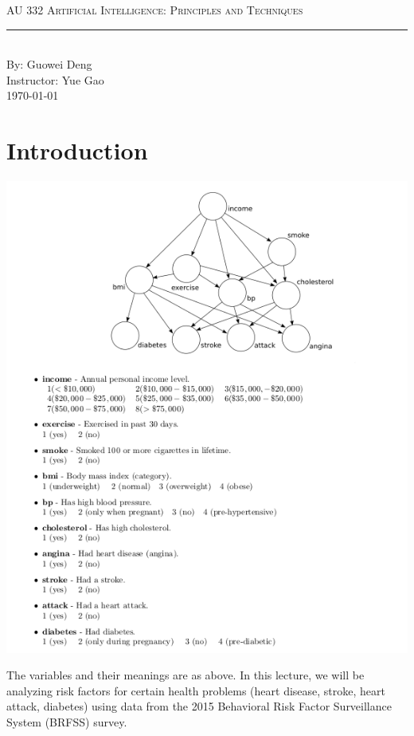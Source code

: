 \documentclass[aps,letterpaper,10pt]{revtex4}
\newcommand{\labtitle}{AU 332 Artificial Intelligence: Principles and Techniques}
\newcommand{\authorname}{Guowei Deng}
\newcommand{\professor}{Yue Gao}
\begin{document}
\begin{titlepage}
\begin{center}
{\Large \textsc{\labtitle} \\ \vspace{4pt}}
\rule[13pt]{\textwidth}{1pt} \\ \vspace{150pt}
{\large By: \authorname \\ \vspace{10pt}
Instructor: \professor \\ \vspace{10pt}
\today}
\end{center}
\end{titlepage}
\section{Introduction}
\begin{center}
\includegraphics[scale=0.8]{graph.png}
\end{center}
The variables and their meanings are as above. In this lecture, we will be analyzing risk factors 
for certain health problems (heart disease, stroke, heart attack, diabetes) using data from the 2015 Behavioral Risk Factor Surveillance System (BRFSS) survey.
\newpage
\end{document}
